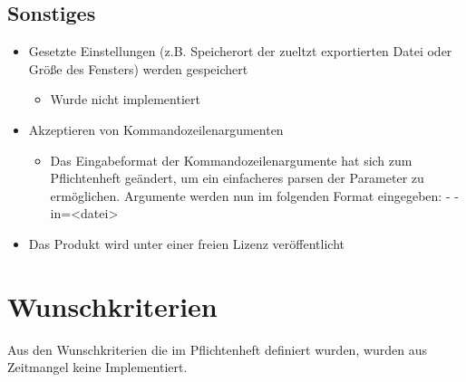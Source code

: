 \subsection{Sonstiges}
\label{implkrit:sonstiges}
\begin{itemize}
	\item Gesetzte Einstellungen (z.B. Speicherort der zueltzt exportierten Datei oder Größe des Fensters) werden gespeichert
		\begin{itemize}
			\item Wurde nicht implementiert
		\end{itemize}
	\item Akzeptieren von Kommandozeilenargumenten
		\begin{itemize}
			\item Das Eingabeformat der Kommandozeilenargumente hat sich zum Pflichtenheft geändert, um ein einfacheres parsen der Parameter zu  ermöglichen. Argumente werden nun im folgenden Format eingegeben: \glqq- -in=<datei>\grqq
		\end{itemize}
	\item Das Produkt wird unter einer freien Lizenz veröffentlicht	
\end{itemize}

\section{Wunschkriterien}
Aus den Wunschkriterien die im Pflichtenheft definiert wurden, wurden aus Zeitmangel keine Implementiert.

